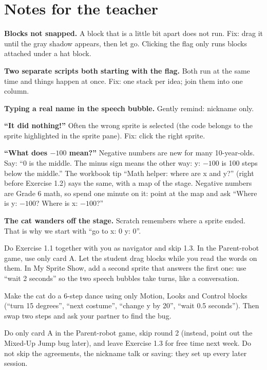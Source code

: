 \section{Notes for the teacher}
\begin{commonmistakes}
  \item \textbf{Blocks not snapped.} A block that is a little bit apart does not run. Fix: drag it until the gray shadow appears, then let go. Clicking the flag only runs blocks attached under a hat block.
  \item \textbf{Two separate scripts both starting with the flag.} Both run at the same time and things happen at once. Fix: one stack per idea; join them into one column.
  \item \textbf{Typing a real name in the speech bubble.} Gently remind: nickname only.
  \item \textbf{\enquote{It did nothing!}} Often the wrong sprite is selected (the code belongs to the sprite highlighted in the sprite pane). Fix: click the right sprite.
  \item \textbf{\enquote{What does $-100$ mean?}} Negative numbers are new for many 10-year-olds. Say: \enquote{0 is the middle. The minus sign means the other way: y: $-100$ is 100 steps below the middle.} The workbook tip \enquote{Math helper: where are x and y?} (right before Exercise 1.2) says the same, with a map of the stage. Negative numbers are Grade 6 math, so spend one minute on it: point at the map and ask \enquote{Where is y: $-100$? Where is x: $-100$?}
  \item \textbf{The cat wanders off the stage.} Scratch remembers where a sprite ended. That is why we start with \enquote{go to x: 0 y: 0}.
\end{commonmistakes}

\begin{differentiation}
\supportpath Do Exercise 1.1 together with you as navigator and skip 1.3. In the Parent-robot game, use only card A. Let the student drag blocks while you read the words on them.
\extensionpath In My Sprite Show, add a second sprite that answers the first one: use \enquote{wait 2 seconds} so the two speech bubbles take turns, like a conversation.
\end{differentiation}

\begin{stretchchallenge}
Make the cat do a 6-step dance using only Motion, Looks and Control blocks (\enquote{turn 15 degrees}, \enquote{next costume}, \enquote{change y by 20}, \enquote{wait 0.5 seconds}). Then swap two steps and ask your partner to find the bug.
\end{stretchchallenge}

\begin{teachernote}
Do only card A in the Parent-robot game, skip round 2 (instead, point out the Mixed-Up Jump bug later), and leave Exercise 1.3 for free time next week. Do not skip the agreements, the nickname talk or saving: they set up every later session.
\end{teachernote}
